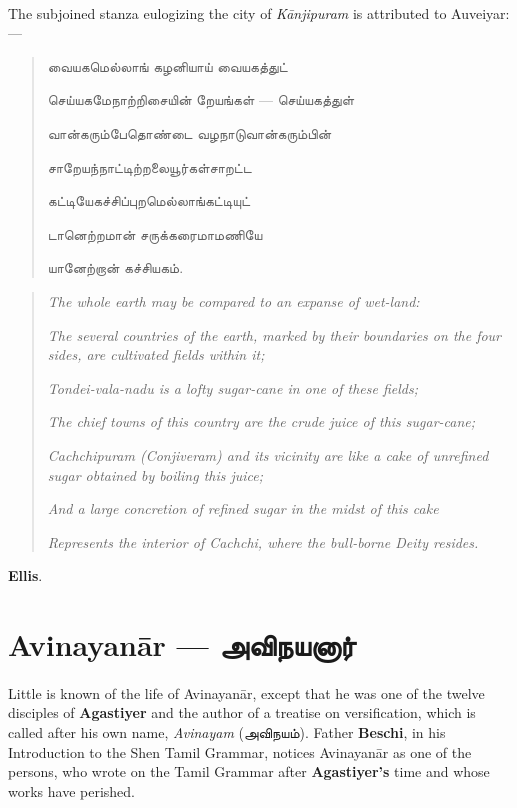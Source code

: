 \documentclass{article}
\newcommand{\TamilText}[1]{\texttamil{#1}}
\newcommand{\TamilBold}[1]{\texttamil{\textbf{#1}}}
\newcommand{\tam}[1]{\TamilText{#1}}
\newcommand{\tambold}[1]{\TamilBold{#1}}
\begin{document}
\paragraph{}
The subjoined stanza eulogizing the city of \emph{K\={a}njipuram} is attributed to Auveiyar:---
\begin{quotation}\small
\tam{வையகமெல்லாங்‌ கழனியாய்‌ வையகத்துட்‌}

\tam{செய்யகமேநாற்றிசையின்‌ றேயங்கள்‌} --- \tam{செய்யகத்துள்‌}

\tam{வான்கரும்பேதொண்டை வழநாடுவான்கரும்பின்‌}

\tam{சாறேயந்நாட்டிற்றலையூர்கள்சாறட்ட}

\tam{கட்டியேகச்சிப்புறமெல்லாங்கட்டியுட்‌}

\tam{டானெற்றமான்‌ சருக்கரைமாமணியே}

\tam{யானேற்றான்‌ கச்சியகம்‌}.
\end{quotation}
\begin{quotation}\small
\emph{The whole earth may be compared to an expanse of wet-land:}

\emph{The several countries of the earth, marked by their boundaries on the four sides, are cultivated fields within it;}

\emph{Tondei-vala-nadu is a lofty sugar-cane in one of these fields;}

\emph{The chief towns of this country are the crude juice of this sugar-cane;}

\emph{Cachchipuram (Conjiveram) and its vicinity are like a cake of unrefined sugar obtained by boiling this juice;}

\emph{And a large concretion of refined sugar in the midst of this cake}

\emph{Represents the interior of Cachchi, where the bull-borne Deity resides.}
\end{quotation}
\begin{flushright}\textbf{Ellis}.\end{flushright}

\section{Avinayan\={a}r --- \tambold{அவிநயனார்}}
\paragraph{}
Little is known of the life of Avinayan\={a}r, except that he was one of the twelve disciples of \textbf{Agastiyer} and the author of a treatise on versification, which is called after his own name, \emph{Avinayam} (\tam{அவிநயம்}). Father \textbf{Beschi}, in his Introduction to the Shen Tamil Grammar, notices Avinayan\={a}r as one of the persons, who wrote on the Tamil Grammar after \textbf{Agastiyer's} time and whose works have perished.
\end{document}
